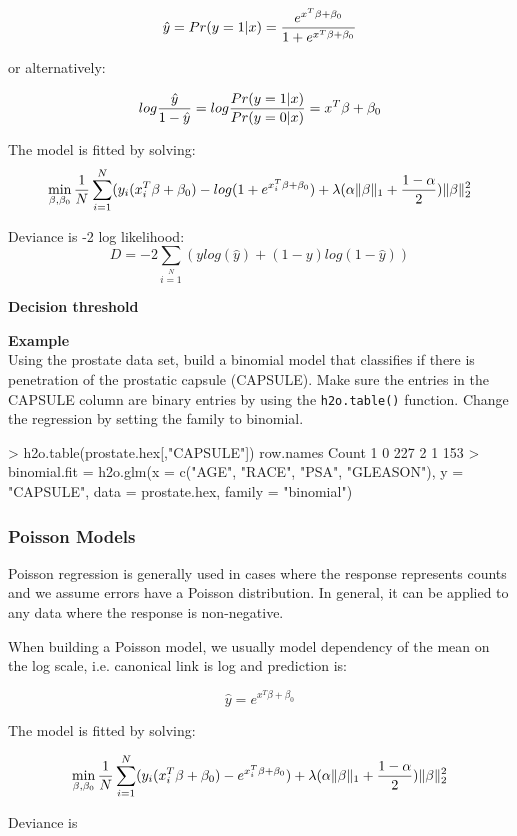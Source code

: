 \documentclass[11pt]{article}
\begin{document}
\[ \hat{y} = Pr(y = 1|x) = {e^{x^T\beta + \beta_0} \over 1 + e^{x^T \beta + \beta_0} } \]

or alternatively:


\[log {\hat{y} \over 1- \hat{y}} = log{Pr(y=1|x) \over Pr(y=0|x)} = x^T \beta + \beta_0\]

The model is fitted by solving:
\[  \min\limits_{\beta,\beta_0} { {1 \over N}\sum\limits_{i=1}\limits^{N}(y_i (x_i^{T}\beta  + \beta_0) - log (1 + e^{x_i^{T}\beta  + \beta_0} )  + \lambda (\alpha \|\beta \|_1 + {1-\alpha \over 2}) \| \beta \|_2^2} \]

Deviance is -2 log likelihood:
\[D = -2\sum\limits_{i=1}\limits^{N}{(y log(\hat{y}) + (1 - y)log(1-\hat{y})  )}\]

\textbf{Decision threshold}

\textbf{Example}\\
Using the prostate data set, build a binomial model that classifies if there is penetration of the prostatic capsule (CAPSULE). Make sure the entries in the CAPSULE column are binary entries by using the \texttt{h2o.table()} function. Change the regression by setting the family to binomial.
\begin{spverbatim}
> h2o.table(prostate.hex[,"CAPSULE"])
  row.names Count
1         0   227
2         1   153
> binomial.fit = h2o.glm(x = c("AGE", "RACE", "PSA", "GLEASON"), y = "CAPSULE", data = prostate.hex, family = "binomial")
\end{spverbatim}

\subsubsection{Poisson Models}
Poisson regression is generally used in cases where the response represents counts and we assume errors have a Poisson distribution. In general, it can be applied to any data where the response is non-negative. 

When building a Poisson model, we usually model dependency of the mean on the log scale, i.e. canonical link is log and prediction is:

\[\hat{y} = e^{x^T\beta + \beta_0}\]

The model is fitted by solving:

\[  \min\limits_{\beta,\beta_0} { {1 \over N}\sum\limits_{i=1}\limits^{N}(y_i (x_i^{T}\beta  + \beta_0) - e^{x_i^{T}\beta  + \beta_0})  + \lambda (\alpha \|\beta \|_1 + {1-\alpha \over 2}) \| \beta \|_2^2} \]

Deviance is 
\end{document}
